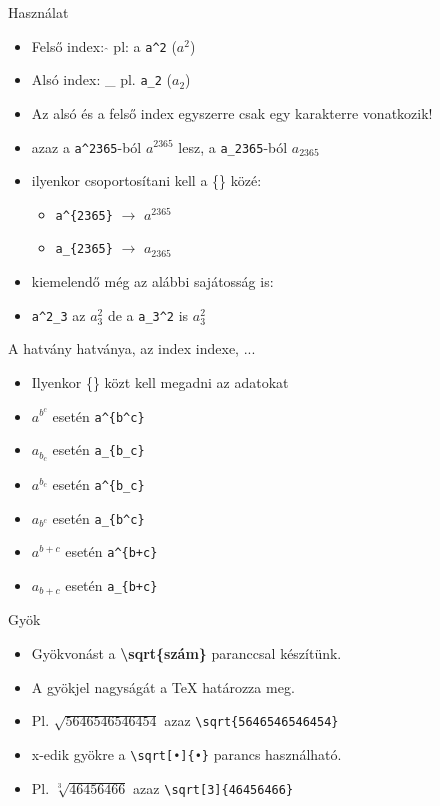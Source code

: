\documentclass[11pt]{beamer}
\newcommand{\tbs}{\textbackslash}
\begin{document}
\begin{frame}[fragile]{Használat}
\begin{itemize}
\item Felső index: $\hat{}$ pl: a \verb+a^2+ ($a^2$)
\item Alsó index: \_ pl. \verb+a_2+ ($a_2$)
\item Az alsó és a felső index egyszerre csak egy karakterre vonatkozik!
\item azaz a \verb|a^2365|-ból $a^2365$ lesz, a \verb|a_2365|-ból $a_2365$
\item ilyenkor csoportosítani kell a \{\} közé:
	\begin{itemize}
	\item \verb|a^{2365}| $\rightarrow$ $a^{2365}$
	\item \verb|a_{2365}| $\rightarrow$ $a_{2365}$
	\end{itemize}
\item kiemelendő még az alábbi sajátosság is:
\item \verb|a^2_3| az $a^2_3$ de a \verb|a_3^2| is $a_3^2$
\end{itemize}
\end{frame}

\begin{frame}[fragile]{A hatvány hatványa, az index indexe, ...}
\begin{itemize}
\item Ilyenkor \{\} közt kell megadni az adatokat
\item $a^{b^c}$ esetén \verb|a^{b^c}|
\item $a_{b_c}$ esetén \verb|a_{b_c}|
\item $a^{b_c}$ esetén \verb|a^{b_c}|
\item $a_{b^c}$ esetén \verb|a_{b^c}|
\item $a^{b+c}$ esetén \verb|a^{b+c}|
\item $a_{b+c}$ esetén \verb|a_{b+c}|
\end{itemize}
\end{frame}

\begin{frame}[fragile]{Gyök}
\begin{itemize}
\item Gyökvonást a \textbf{\tbs sqrt\{szám\}} paranccsal készítünk.
\item A gyökjel nagyságát a \TeX{} határozza meg.
\item Pl. $\sqrt{5646546546454}$ azaz \verb|\sqrt{5646546546454}|
\item x-edik gyökre a \verb|\sqrt[•]{•}| parancs használható.
\item Pl. $\sqrt[3]{46456466}$ azaz \verb|\sqrt[3]{46456466}|
\end{itemize}
\end{frame}
\end{document}
